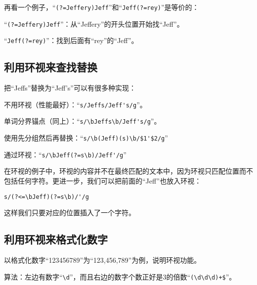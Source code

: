再看一个例子，“\verb|(?=Jeffery)Jeff|”和“\verb|Jeff(?=rey)|”是等价的：

“\verb|(?=Jeffery)Jeff|”：从“Jeffery”的开头位置开始找“Jeff”。

“\verb|Jeff(?=rey)|”：找到后面有“rey”的“Jeff”。



\subsection{利用环视来查找替换}

把“Jeffs”替换为“Jeff's”可以有很多种实现：

不用环视（性能最好）：“\verb|s/Jeffs/Jeff's/g|”。

单词分界锚点（同上）：“\verb|s/\bJeffs\b/Jeff's/g|”。

使用先分组然后再替换：“\verb|s/\b(Jeff)(s)\b/$1'$2/g|”

通过环视：“\verb|s/\bJeff(?=s\b)/Jeff'/g|”

在环视的例子中，环视的内容并不在最终匹配的文本中，因为环视只匹配位置而不包括任何字符。更进一步，我们可以把前面的“Jeff”也放入环视：

\verb|s/(?<=\bJeff)(?=s\b)/'/g|

这样我们只要对应的位置插入了一个字符。



\subsection{利用环视来格式化数字}

以格式化数字“123456789”为“123,456,789”为例，说明环视功能。

算法：左边有数字“\verb|\d|”，而且右边的数字个数正好是3的倍数“\verb|(\d\d\d)+$|”。
